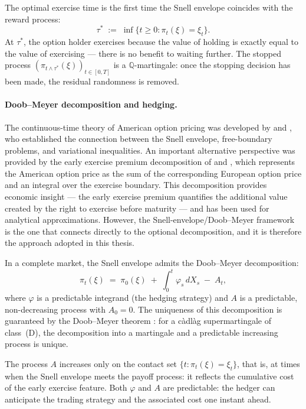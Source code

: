 The optimal exercise time is the first time the Snell envelope coincides
with the reward process:
\begin{equation}
\label{eq:optimal_stopping_time}
\tau^* \;:=\; \inf\{t \ge 0 : \pi_t(\xi) = \xi_t\}.
\end{equation}
At $\tau^*$, the option holder exercises because the value of holding is
exactly equal to the value of exercising --- there is no benefit to
waiting further.  The stopped process
$(\pi_{t \wedge \tau^*}(\xi))_{t \in [0,T]}$ is a $\mathbb{Q}$-martingale:
once the stopping decision has been made, the residual randomness is
removed.

\paragraph{Doob--Meyer decomposition and hedging.}
The continuous-time theory of American option pricing was developed by
\citet{Bensoussan1984} and \citet{Karatzas1988}, who established the
connection between the Snell envelope, free-boundary problems, and
variational inequalities.  An important alternative perspective was
provided by the early exercise premium decomposition of
\citet{Kim1990} and \citet{CarrJarrowMyneni1992}, which represents the
American option price as the sum of the corresponding European option
price and an integral over the exercise boundary.  This decomposition
provides economic insight --- the early exercise premium quantifies the
additional value created by the right to exercise before maturity --- and
has been used for analytical approximations.  However, the
Snell-envelope/Doob--Meyer framework is the one that connects directly to
the optional decomposition, and it is therefore the approach adopted in
this thesis.

In a complete market, the Snell envelope admits the Doob--Meyer
decomposition:
\begin{equation}
\label{eq:doob_meyer_american_ch2}
\pi_t(\xi) \;=\; \pi_0(\xi)
\;+\; \int_0^t \varphi_s \, dX_s \;-\; A_t,
\end{equation}
where $\varphi$ is a predictable integrand (the hedging strategy) and
$A$ is a predictable, non-decreasing process with $A_0 = 0$.  The
uniqueness of this decomposition is guaranteed by the Doob--Meyer theorem
\citep{KaratzasShreve1991}: for a c\`{a}dl\`{a}g supermartingale of
class~(D), the decomposition into a martingale and a predictable
increasing process is unique.

The process $A$ increases only on the contact set
$\{t : \pi_t(\xi) = \xi_t\}$, that is, at times when the Snell envelope
meets the payoff process: it reflects the cumulative cost of the early
exercise feature.  Both $\varphi$ and $A$ are predictable: the hedger can
anticipate the trading strategy and the associated cost one instant ahead.

